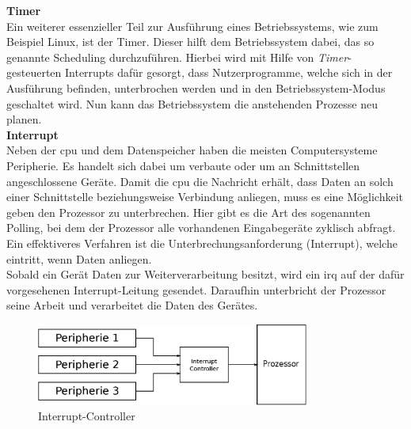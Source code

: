  \textbf{Timer}\\
 Ein weiterer essenzieller Teil zur Ausführung eines Betriebssystems, wie zum Beispiel Linux, ist der Timer. Dieser hilft dem Betriebssystem dabei, das so genannte Scheduling
 durchzuführen. Hierbei wird mit Hilfe von \emph{Timer}-gesteuerten Interrupts dafür gesorgt, dass Nutzerprogramme, welche sich in der Ausführung befinden, unterbrochen werden und
 in den Betriebssystem-Modus geschaltet wird. Nun kann das Betriebssystem die anstehenden Prozesse neu planen.\\

 \textbf{Interrupt}\\
 Neben der \ac{cpu} und dem Datenspeicher haben die meisten Computersysteme Peripherie. Es handelt sich dabei um verbaute oder um an Schnittstellen angeschlossene Geräte.
 Damit die \ac{cpu} die Nachricht erhält, dass Daten an solch einer Schnittstelle beziehungsweise Verbindung anliegen, muss es eine Möglichkeit geben den Prozessor zu
 unterbrechen. Hier gibt es die Art des sogenannten Polling, bei dem der Prozessor alle vorhandenen Eingabegeräte zyklisch abfragt. Ein effektiveres Verfahren ist die
 Unterbrechungsanforderung (Interrupt), welche eintritt, wenn Daten anliegen. \\
 Sobald ein Gerät Daten zur Weiterverarbeitung besitzt, wird ein \ac{irq} auf der dafür vorgesehenen Interrupt-Leitung gesendet. Daraufhin unterbricht der Prozessor
 seine Arbeit und verarbeitet die Daten des Gerätes.\cite{irq}\\

 \begin{figure}[H]
 \centering
 \includegraphics[width=0.8\textwidth]{Hauptteil/irq.eps}
 \caption{Interrupt-Controller}\label{fig:irq}
 \end{figure}



